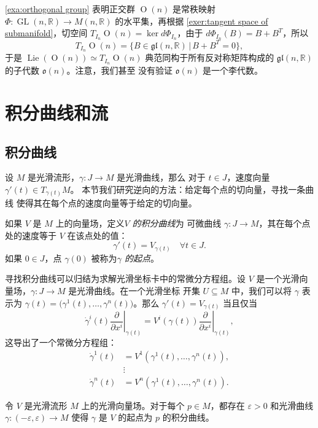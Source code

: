 \documentclass[fontset=none]{Notes}
\DeclareMathOperator\GL{GL}
\DeclareMathOperator\Orth{O}
\DeclareMathOperator\Lie{Lie}
\begin{document}
\begin{example}[$\Orth(n)$ 的李代数]
  \autoref{exa:orthogonal group} 表明正交群 $\Orth(n)$ 是常秩映射
  $\varPhi:\GL(n,\mathbb{R})\to M(n,\mathbb{R})$ 的水平集，再根据
  \autoref{exer:tangent space of submanifold}，切空间
  $T_{I_n}\Orth(n)=\ker d\varPhi_{I_n}$，由于
  $d\varPhi_{I_n}(B)=B+B^T$，所以
  \[
    T_{I_n}\Orth(n)=\{B\in \mathfrak{gl}(n,\mathbb{R})\,|\, B+B^T=0\},  
  \]
  于是 $\Lie(\Orth(n))\simeq T_{I_n}\Orth(n)$ 典范同构于所有反对称矩阵构成的
  $\mathfrak{gl}(n,\mathbb{R})$ 的子代数 $\mathfrak{o}(n)$。注意，我们甚至
  没有验证 $\mathfrak{o}(n)$ 是一个李代数。
\end{example}

\chapter{积分曲线和流}

\section{积分曲线}

设 $M$ 是光滑流形，$\gamma:J\to M$ 是光滑曲线，那么
对于 $t\in J$，速度向量 $\gamma'(t)\in T_{\gamma(t)}M$。
本节我们研究逆向的方法：给定每个点的切向量，寻找一条曲线
使得其在每个点的速度向量等于给定的切向量。

如果 $V$ 是 $M$ 上的向量场，定义\emph{$V$ 的积分曲线}为
可微曲线 $\gamma:J\to M$，其在每个点处的速度等于 $V$ 在该点处的值：
\[
  \gamma'(t)=V_{\gamma(t)}\quad \forall t\in J.  
\]
如果 $0\in J$，点 $\gamma(0)$ 被称为\emph{$\gamma$ 的起点}。

寻找积分曲线可以归结为求解光滑坐标卡中的常微分方程组。设
$V$ 是一个光滑向量场，$\gamma:J\to M$ 是光滑曲线。在一个光滑坐标
开集 $U\subseteq M$ 中，我们可以将 $\gamma$ 表示为
$\gamma(t)=\bigl(\gamma^1(t),\dots,\gamma^n(t)\bigr)$。那么
$\gamma'(t)=V_{\gamma(t)}$ 当且仅当
\[
  \dot\gamma^i(t)\left.\frac{\partial}{\partial x^i}\right|_{\gamma(t)}  
  =V^i(\gamma(t))\left.\frac{\partial}{\partial x^i}\right|_{\gamma(t)} ,
\] 
这导出了一个常微分方程组：
\begin{align*}
  \dot\gamma^1(t)
  &=V^1(\gamma^1(t),\dots,\gamma^n(t)) ,\\
  &\vdots \\
  \dot\gamma^n(t)
  &=V^n(\gamma^1(t),\dots,\gamma^n(t)).
\end{align*}

\begin{proposition}
  令 $V$ 是光滑流形 $M$ 上的光滑向量场。对于每个 $p\in M$，都存在
  $\varepsilon>0$ 和光滑曲线 $\gamma:(-\varepsilon,\varepsilon)\to M$
  使得 $\gamma$ 是 $V$ 的起点为 $p$ 的积分曲线。
\end{proposition}
\end{document}
